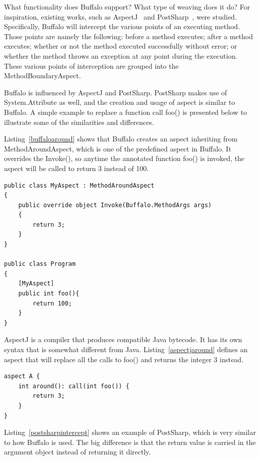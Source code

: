What functionality does Buffalo support? What type of weaving does it do? For inspiration, existing works, such as AspectJ~\cite{aspectj_faq} and PostSharp~\cite{postsharp}, were studied. Specifically, Buffalo will intercept the various points of an executing method. Those points are namely the following: before a method executes; after a method executes; whether or not the method executed successfully without error; or whether the method throws an exception at any point during the execution. These various points of interception are grouped into the MethodBoundaryAspect.

Buffalo is influenced by AspectJ and PostSharp. PostSharp makes use of System.Attribute as well, and the creation and usage of aspect is similar to Buffalo. A simple example to replace a function call foo() is presented below to illustrate some of the similarities and differences.

Listing~\ref{buffaloaround} shows that Buffalo creates an aspect inheriting from MethodAroundAspect, which is one of the predefined aspect in Buffalo. It overrides the Invoke(), so anytime the annotated function foo() is invoked, the aspect will be called to return 3 instead of 100.

\begin{minipage}{\textwidth}
\begin{lstlisting}[caption={Buffalo MethodAroundAspect}, label=buffaloaround]
public class MyAspect : MethodAroundAspect
{
    public override object Invoke(Buffalo.MethodArgs args)
    {
        return 3;
    }
}

public class Program
{
    [MyAspect]
    public int foo(){
        return 100;
    }
}
\end{lstlisting}
\end{minipage}

AspectJ is a compiler that produces compatible Java bytecode. It has its own syntax that is somewhat different from Java. Listing~\ref{aspectjaround} defines an aspect that will replace all the calls to foo() and returns the integer 3 instead.

\begin{minipage}{\textwidth}
\begin{lstlisting}[caption={AspectJ Around}, label=aspectjaround]
aspect A {
    int around(): call(int foo()) {
        return 3;
    }
}
\end{lstlisting}
\end{minipage}


Listing~\ref{postsharpintercept} shows an example of PostSharp, which is very similar to how Buffalo is used. The big difference is that the return value is carried in the argument object instead of returning it directly.

